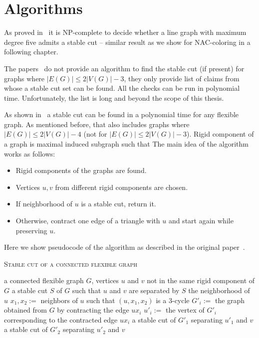 \section{Algorithms}

As proved in~\cite{stable_cuts_complexity} it is NP-complete
to decide whether a line graph with maximum degree five admits a stable cut
-- similar result as we show for NAC-coloring in a following chapter.

The papers~\cite{stable_cuts_2v_3,stable_cuts_2v_3_revisit} do not provide
an algorithm to find the stable cut (if present)
for graphs where \(|E(G)| \le 2|V(G)|-3 \),
they only provide list of claims
from whose a stable cut set can be found.
All the checks can be run in polynomial time.
Unfortunately, the list is long and beyond the scope of this thesis.

As shown in~\cite[Algorithm 1]{stable_cuts_legersky} a stable cut can be found
in a polynomial time for any flexible graph.
As mentioned before, that also includes graphs
where \( |E(G)| \le 2|V(G)| - 4 \) (not for \( |E(G)| \le 2|V(G)| - 3 \)).
Rigid component of a graph is maximal induced subgraph such that
The main idea of the algorithm works as follows:
%
\begin{itemize}
	\item Rigid components of the graphs are found.
	\item Vertices \( u, v \) from different rigid components are chosen.
	\item If neighborhood of \( u \) is a stable cut, return it.
	\item Otherwise, contract one edge of a triangle with \( u \) and start again while preserving \( u \).
\end{itemize}

Here we show pseudocode of the algorithm as described
in the original paper~\cite{stable_cuts_legersky}.
%
\begin{algorithm}[ht]
	\caption{\textsc{Stable cut of a connected flexible graph}}%
	\label{alg:stableCutFlexible}%
	\begin{algorithmic}[1]
		\Require{} a connected flexible graph $G$, vertices $u$ and $v$ not in the same rigid component of $G$
		\Ensure{} a stable cut $S$ of $G$ such that $u$ and $v$ are separated by $S$
		\State\Return{} the neighborhood of $u$
		\Else{}
		\State{} $x_1,x_2 :={}$ neighbors of $u$ such that $(u,x_1,x_2)$  is a $3$-cycle
		\State{} $G'_i :={}$ the graph obtained from $G$ by contracting the edge $ux_i$
		\State{} $u'_i :={}$ the vertex of $G'_i$ corresponding to the contracted edge $ux_i$
		\EndFor{}
		\State\Return{} a stable cut of $G'_1$ separating $u'_1$ and $v$
		\Else{}
		\State\Return{} a stable cut of $G'_2$ separating $u'_2$ and $v$
		\EndIf{}
		\EndIf{}
	\end{algorithmic}
\end{algorithm}
%

